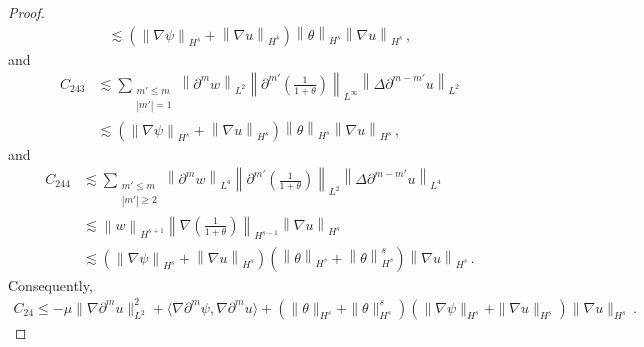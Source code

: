 \documentclass[reqno,11pt]{amsart}
\numberwithin{equation}{section}
\begin{document}
\begin{proof}
\begin{equation*}
\begin{aligned}
\lesssim \left( \left\| \nabla \psi \right\|_{H^s} + \left\| \nabla u \right\|_{H^s} \right) \left\| \theta \right\|_{H^s} \left\| \nabla u \right\|_{H^s} \,,
\end{aligned}
\end{equation*}
and
\begin{equation*}
\begin{aligned}
C_{243}&\lesssim\sum_{\substack{m' \leq m \\ |m'|=1}} \left\| \partial^m w \right\|_{L^2} \left\| \partial^{m'} \left( \frac{1}{1+\theta} \right) \right\|_{L^\infty} \left\| \Delta \partial^{m-m'} u \right\|_{L^2} \\&
\lesssim \left( \left\| \nabla \psi \right\|_{H^s} + \left\| \nabla u \right\|_{H^s} \right) \left\| \theta \right\|_{H^s} \left\| \nabla u \right\|_{H^s} \,,
\end{aligned}
\end{equation*}
and
\begin{equation*}
\begin{aligned}
C_{244}&\lesssim \sum_{\substack{m' \leq m \\ |m'| \geq 2}} \left\| \partial^m w \right\|_{L^4} \left\| \partial^{m'} \left( \frac{1}{1+\theta} \right) \right\|_{L^2} \left\| \Delta \partial^{m-m'} u \right\|_{L^4} \\&
\lesssim \left\| w \right\|_{H^{s+1}} \left\| \nabla \left( \frac{1}{1+\theta} \right) \right\|_{H^{s-1}} \left\| \nabla u \right\|_{H^s} \\&
\lesssim \left( \left\| \nabla \psi \right\|_{H^s} + \left\| \nabla u \right\|_{H^s} \right) \left( \left\| \theta \right\|_{H^s} + \left\| \theta \right\|_{H^s}^s \right) \left\| \nabla u \right\|_{H^s} \,.
\end{aligned}
\end{equation*}
Consequently,
\begin{equation}\label{gpsi-eq18}
\begin{aligned}
C_{24} \leq -\mu \| \nabla \partial^m u \|_{L^2}^2 + \langle \nabla \partial^m \psi, \nabla \partial^m u \rangle + ( \|\theta\|_{H^s} + \|\theta\|_{H^s}^s ) ( \|\nabla \psi\|_{H^s} + \|\nabla u\|_{H^s} ) \| \nabla u \|_{H^s} \,.
\end{aligned}
\end{equation}


\end{proof}
\end{document}
